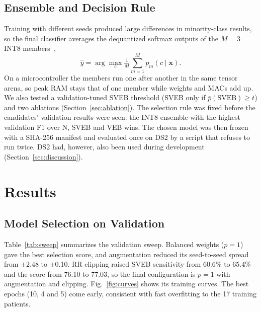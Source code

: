 \documentclass[conference]{IEEEtran}
\begin{document}
\subsection{Ensemble and Decision Rule}
Training with different seeds produced large differences in minority-class results, so the final classifier averages the dequantized softmax outputs of the $M=3$ INT8 members~\cite{lakshminarayanan2017ensembles},
\begin{equation}
\hat{y}=\arg\max_c \tfrac{1}{M}\textstyle\sum_{m=1}^{M} p_m(c\mid\mathbf{x}).
\end{equation}
On a microcontroller the members run one after another in the same tensor arena, so peak RAM stays that of one member while weights and MACs add up. We also tested a validation-tuned SVEB threshold (SVEB only if $\bar{p}(\mathrm{SVEB})\ge t$) and two ablations (Section~\ref{sec:ablation}). The selection rule was fixed before the candidates' validation results were seen: the INT8 ensemble with the highest validation F1 over N, SVEB and VEB wins. The chosen model was then frozen with a SHA-256 manifest and evaluated once on DS2 by a script that refuses to run twice. DS2 had, however, also been used during development (Section~\ref{sec:discussion}).

\section{Results}
\subsection{Model Selection on Validation}
Table~\ref{tab:sweep} summarizes the validation sweep. Balanced weights ($p=1$) gave the best selection score, and augmentation reduced its seed-to-seed spread from $\pm$2.48 to $\pm$0.10. RR clipping raised SVEB sensitivity from 60.6\% to 65.4\% and the score from 76.10 to 77.03, so the final configuration is $p=1$ with augmentation and clipping. Fig.~\ref{fig:curves} shows its training curves. The best epochs (10, 4 and 5) come early, consistent with fast overfitting to the 17 training patients.
\end{document}
